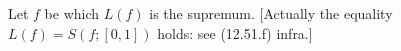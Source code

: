 Let $f$ be
which $L(f)$ is the supremum. [Actually the equality $L(f) = S(f; [0, 1])$ holds: see (12.51.f) infra.]